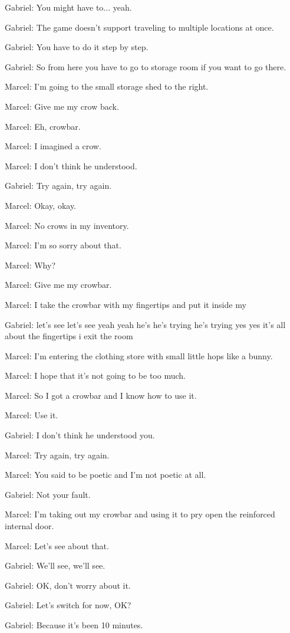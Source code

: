 Gabriel: You might have to... yeah.

Gabriel: The game doesn't support traveling to multiple locations at once.

Gabriel: You have to do it step by step.

Gabriel: So from here you have to go to storage room if you want to go there.

Marcel: I'm going to the small storage shed to the right.

Marcel: Give me my crow back.

Marcel: Eh, crowbar.

Marcel: I imagined a crow.

Marcel: I don't think he understood.

Gabriel: Try again, try again.

Marcel: Okay, okay.

Marcel: No crows in my inventory.

Marcel: I'm so sorry about that.

Marcel: Why?

Marcel: Give me my crowbar.

Marcel: I take the crowbar with my fingertips and put it inside my

Gabriel: let's see let's see yeah yeah he's he's trying he's trying yes yes it's all about the fingertips i exit the room

Marcel: I'm entering the clothing store with small little hops like a bunny.

Marcel: I hope that it's not going to be too much.

Marcel: So I got a crowbar and I know how to use it.

Marcel: Use it.

Gabriel: I don't think he understood you.

Marcel: Try again, try again.

Marcel: You said to be poetic and I'm not poetic at all.

Gabriel: Not your fault.

Marcel: I'm taking out my crowbar and using it to pry open the reinforced internal door.

Marcel: Let's see about that.

Gabriel: We'll see, we'll see.

Gabriel: OK, don't worry about it.

Gabriel: Let's switch for now, OK?

Gabriel: Because it's been 10 minutes.

